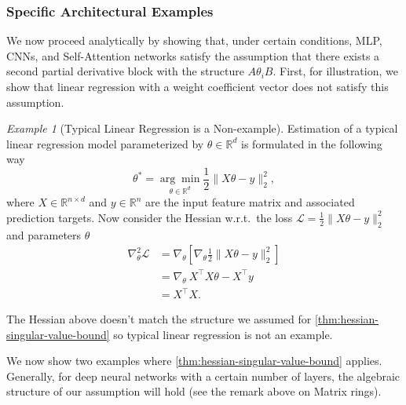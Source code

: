 \documentclass{article}
\theoremstyle{plain}
\theoremstyle{definition}
\theoremstyle{remark}
\newtheorem{example}[theorem]{Example}
\begin{document}
\subsubsection{Specific Architectural Examples}
\label{app:specific-architectural-examples}

We now proceed analytically by showing that, under certain conditions, MLP, CNNs, and Self-Attention networks satisfy the assumption that there exists a second partial derivative block with the structure $A\theta_iB$. First, for illustration, we show that linear regression with a weight coefficient vector does not satisfy this assumption.

\begin{example}[Typical Linear Regression is a Non-example]
\label{example:linear-regression}
Estimation of a typical linear regression model parameterized by $\theta \in \mathbb{R}^d$ is formulated in the following way \[
\theta^* = \underset{\theta \in \mathbb{R}^d}{\arg\min}  \frac{1}{2}\|X\theta - y\|_2^2,
\] where $X \in \mathbb{R}^{n \times d}$ and $y \in \mathbb{R}^{n}$ are the input feature matrix and associated prediction targets. Now consider the Hessian w.r.t.\ the loss $\mathcal{L} = \frac{1}{2}\|X\theta - y\|_2^2$ and parameters $\theta$ \begin{align*}
\nabla^2_{\theta} \mathcal{L} &= \nabla_\theta \left[ \nabla_\theta \frac{1}{2}\|X\theta - y\|_2^2 \right]  \\
&= \nabla_\theta \: X^{\top}X\theta - X^{\top}y \\
&=  X^{\top}X.
\end{align*}

The Hessian above doesn't match the structure we assumed for \cref{thm:hessian-singular-value-bound} so typical linear regression is not an example.
\end{example}

We now show two examples where \cref{thm:hessian-singular-value-bound} applies. Generally, for deep neural networks with a certain number of layers, the algebraic structure of our assumption will hold (see the remark above on Matrix rings).

\end{document}
